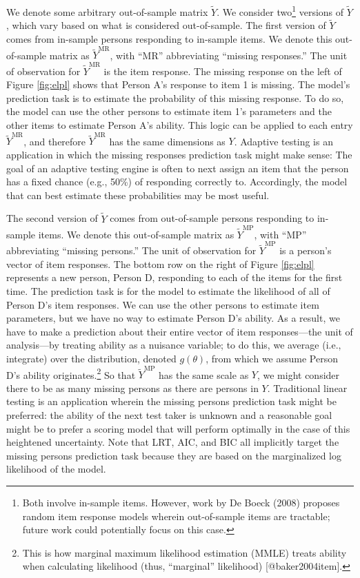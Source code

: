 \documentclass[
  english,
  man,floatsintext]{apa7}
\begin{document}
We denote some arbitrary out-of-sample matrix \(\tilde Y\). We consider two\footnote{Both involve in-sample items. However, work by De Boeck (2008) proposes random item response models wherein out-of-sample items are tractable; future work could potentially focus on this case.} versions of \(\tilde Y\), which vary based on what is considered out-of-sample. The first version of \(\tilde Y\) comes from in-sample persons responding to in-sample items. We denote this out-of-sample matrix as \(\tilde Y^{\text{MR}}\), with ``MR'' abbreviating ``missing responses.'' The unit of observation for \(\tilde Y^{\text{MR}}\) is the item response. The missing response on the left of Figure \ref{fig:elpl} shows that Person A's response to item 1 is missing. The model's prediction task is to estimate the probability of this missing response. To do so, the model can use the other persons to estimate item 1's parameters and the other items to estimate Person A's ability. This logic can be applied to each entry \(\tilde Y^{\text{MR}}\), and therefore \(\tilde Y^{\text{MR}}\) has the same dimensions as \(Y\). Adaptive testing is an application in which the missing responses prediction task might make sense: The goal of an adaptive testing engine is often to next assign an item that the person has a fixed chance (e.g., 50\%) of responding correctly to. Accordingly, the model that can best estimate these probabilities may be most useful.

The second version of \(\tilde Y\) comes from out-of-sample persons responding to in-sample items. We denote this out-of-sample matrix as \(\tilde Y^{\text{MP}}\), with ``MP'' abbreviating ``missing persons.'' The unit of observation for \(\tilde Y^{\text{MP}}\) is a person's vector of item responses. The bottom row on the right of Figure \ref{fig:elpl} represents a new person, Person D, responding to each of the items for the first time. The prediction task is for the model to estimate the likelihood of all of Person D's item responses. We can use the other persons to estimate item parameters, but we have no way to estimate Person D's ability. As a result, we have to make a prediction about their entire vector of item responses---the unit of analysis---by treating ability as a nuisance variable; to do this, we average (i.e., integrate) over the distribution, denoted \(g(\theta)\), from which we assume Person D's ability originates.\footnote{This is how marginal maximum likelihood estimation (MMLE) treats ability when calculating likelihood (thus, ``marginal'' likelihood) [@baker2004item].} So that \(\tilde Y^{\text{MP}}\) has the same scale as \(Y\), we might consider there to be as many missing persons as there are persons in \(Y\). Traditional linear testing is an application wherein the missing persons prediction task might be preferred: the ability of the next test taker is unknown and a reasonable goal might be to prefer a scoring model that will perform optimally in the case of this heightened uncertainty. Note that LRT, AIC, and BIC all implicitly target the missing persons prediction task because they are based on the marginalized log likelihood of the model.
\end{document}
